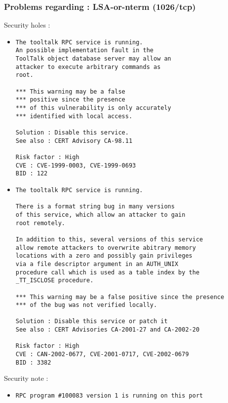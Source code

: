 \documentclass{article}
\begin{document}
\subsubsection{Problems regarding : LSA-or-nterm (1026/tcp)}
Security holes :\\
\begin{itemize}
\item \begin{verbatim}
The tooltalk RPC service is running.
An possible implementation fault in the 
ToolTalk object database server may allow an
attacker to execute arbitrary commands as
root.

*** This warning may be a false 
*** positive since the presence
*** of this vulnerability is only accurately
*** identified with local access.
    
Solution : Disable this service.
See also : CERT Advisory CA-98.11

Risk factor : High
CVE : CVE-1999-0003, CVE-1999-0693
BID : 122
\end{verbatim}\item \begin{verbatim}
The tooltalk RPC service is running.

There is a format string bug in many versions
of this service, which allow an attacker to gain
root remotely.

In addition to this, several versions of this service
allow remote attackers to overwrite abitrary memory
locations with a zero and possibly gain privileges
via a file descriptor argument in an AUTH_UNIX 
procedure call which is used as a table index by the
_TT_ISCLOSE procedure.

*** This warning may be a false positive since the presence
*** of the bug was not verified locally.
    
Solution : Disable this service or patch it
See also : CERT Advisories CA-2001-27 and CA-2002-20

Risk factor : High
CVE : CAN-2002-0677, CVE-2001-0717, CVE-2002-0679
BID : 3382
\end{verbatim}\end{itemize}
Security note :\\
\begin{itemize}
\item \begin{verbatim}
RPC program #100083 version 1 is running on this port
\end{verbatim}\end{itemize}
\end{document}
